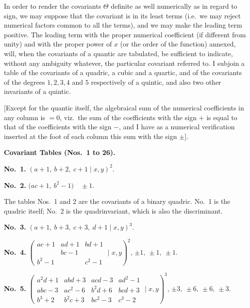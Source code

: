 \documentclass[11pt]{article}
\begin{document}
In order to render the covariants $\Theta$ definite as well numerically as in regard to sign, we may suppose that the covariant is in its least terms (i.e.\ we may reject numerical factors common to all the terms), and we may make the leading term positive. The leading term with the proper numerical coefficient (if different from unity) and with the proper power of $x$ (or the order of the function) annexed, will, when the covariants of a quantic are tabulated, be sufficient to indicate, without any ambiguity whatever, the particular covariant referred to. I subjoin a table of the covariants of a quadric, a cubic and a quartic, and of the covariants of the degrees $1, 2, 3, 4$ and $5$ respectively of a quintic, and also two other invariants of a quintic.

[Except for the quantic itself, the algebraical sum of the numerical coefficients in any column is $=0$, viz.\ the sum of the coefficients with the sign $+$ is equal to that of the coefficients with the sign $-$, and I have as a numerical verification inserted at the foot of each column this sum with the sign $\pm$].

\bigskip
\begin{center}\textbf{Covariant Tables (Nos.\ 1 to 26).}\end{center}

\textbf{No.~1.} \quad $(a+1,\ b+2,\ c+1 \mid x, y)^2$.

\textbf{No.~2.} \quad $\bigl(ac + 1,\ b^2 - 1\bigr) \quad \pm 1$.

The tables Nos.~1 and 2 are the covariants of a binary quadric. No.~1 is the quadric itself; No.~2 is the quadrinvariant, which is also the discriminant.

\textbf{No.~3.} \quad $(a+1,\ b+3,\ c+3,\ d+1 \mid x, y)^3$.

\textbf{No.~4.} \quad
$\left(\begin{array}{ccc} ac+1 & ad+1 & bd+1 \\ & bc-1 & \\ b^2-1 & & c^2-1 \end{array} \mid x, y\right)^2$, \quad $\pm 1,\ \pm 1,\ \pm 1$.

\textbf{No.~5.} \quad
$\left(\begin{array}{cccc} a^2 d + 1 & abd + 3 & acd - 3 & ad^2 - 1 \\ abc - 3 & ac^2 - 6 & b^2 d + 6 & bcd + 3 \\ b^3 + 2 & b^2 c + 3 & bc^2 - 3 & c^3 - 2 \end{array} \mid x, y\right)^3$, \quad $\pm 3,\ \pm 6,\ \pm 6,\ \pm 3$.
\end{document}
